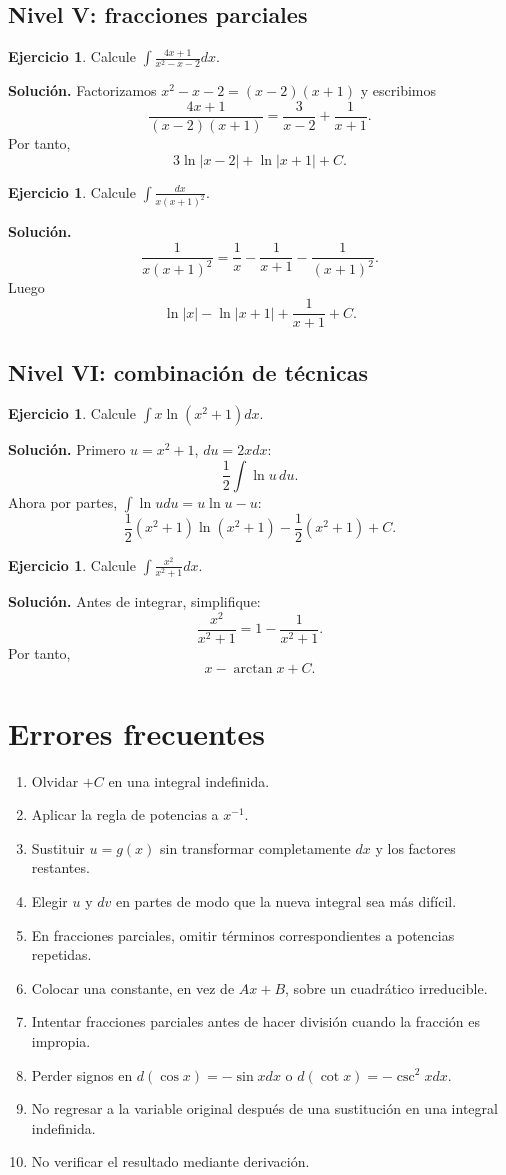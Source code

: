 \documentclass[12pt]{article}
\theoremstyle{definition}
\newtheorem{ejercicio}[teorema]{Ejercicio}
\theoremstyle{remark}
\begin{document}
\subsection*{Nivel V: fracciones parciales}
\begin{ejercicio}Calcule $\int\frac{4x+1}{x^2-x-2}dx$.\end{ejercicio}
\textbf{Solución.} Factorizamos $x^2-x-2=(x-2)(x+1)$ y escribimos
\[\frac{4x+1}{(x-2)(x+1)}=\frac{3}{x-2}+\frac1{x+1}.\]
Por tanto,
\[\boxed{3\ln|x-2|+\ln|x+1|+C}.\]
\begin{ejercicio}Calcule $\int\frac{dx}{x(x+1)^2}$.\end{ejercicio}
\textbf{Solución.}
\[\frac1{x(x+1)^2}=\frac1x-\frac1{x+1}-\frac1{(x+1)^2}.\]
Luego
\[\boxed{\ln|x|-\ln|x+1|+\frac1{x+1}+C}.\]

\subsection*{Nivel VI: combinación de técnicas}
\begin{ejercicio}Calcule $\int x\ln(x^2+1)dx$.\end{ejercicio}
\textbf{Solución.} Primero $u=x^2+1$, $du=2xdx$:
\[\frac12\int\ln u\,du.\]
Ahora por partes, $\int\ln udu=u\ln u-u$:
\[\boxed{\frac12(x^2+1)\ln(x^2+1)-\frac12(x^2+1)+C}.\]
\begin{ejercicio}Calcule $\int\frac{x^2}{x^2+1}dx$.\end{ejercicio}
\textbf{Solución.} Antes de integrar, simplifique:
\[\frac{x^2}{x^2+1}=1-\frac1{x^2+1}.\]
Por tanto,
\[\boxed{x-\arctan x+C}.\]

\section{Errores frecuentes}
\begin{enumerate}
\item Olvidar $+C$ en una integral indefinida.
\item Aplicar la regla de potencias a $x^{-1}$.
\item Sustituir $u=g(x)$ sin transformar completamente $dx$ y los factores restantes.
\item Elegir $u$ y $dv$ en partes de modo que la nueva integral sea más difícil.
\item En fracciones parciales, omitir términos correspondientes a potencias repetidas.
\item Colocar una constante, en vez de $Ax+B$, sobre un cuadrático irreducible.
\item Intentar fracciones parciales antes de hacer división cuando la fracción es impropia.
\item Perder signos en $d(\cos x)=-\sin xdx$ o $d(\cot x)=-\csc^2xdx$.
\item No regresar a la variable original después de una sustitución en una integral indefinida.
\item No verificar el resultado mediante derivación.
\end{enumerate}
\end{document}
